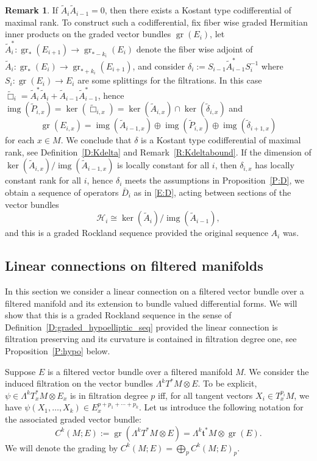 \documentclass[reqno,12pt]{amsart}
\DeclareMathOperator{\img}{img}
\DeclareMathOperator{\gr}{gr}
\theoremstyle{plain}
\theoremstyle{definition}
\newtheorem{remark}[theorem]{Remark}
\begin{document}
\begin{remark}\label{R:Kdeltaexi}
If $\tilde A_i\tilde A_{i-1}=0$, then there exists a Kostant type codifferential of maximal rank.
To construct such a codifferential, fix fiber wise graded Hermitian inner products on the graded vector bundles $\gr(E_i)$, let $\tilde A_i^*\colon\gr_*(E_{i+1})\to\gr_{*-k_i}(E_i)$ denote the fiber wise adjoint of $\tilde A_i\colon\gr_*(E_i)\to\gr_{*+k_i}(E_{i+1})$, and consider $\delta_i:=S_{i-1}\tilde A_{i-1}^*S_i^{-1}$ where $S_i\colon\gr(E_i)\to E_i$ are some splittings for the filtrations.
In this case $\tilde\Box_i=\tilde A_i^*\tilde A_i+\tilde A_{i-1}\tilde A_{i-1}^*$, hence $\img(\tilde P_{i,x})=\ker(\tilde\Box_{i,x})=\ker(\tilde A_{i,x})\cap\ker(\tilde\delta_{i,x})$ 
and 
$$
\gr(E_{i,x})=\img(\tilde A_{i-1,x})\oplus\img(\tilde P_{i,x})\oplus\img(\tilde\delta_{i+1,x})
$$
for each $x\in M$.
We conclude that $\delta$ is a Kostant type codifferential of maximal rank, see Definition~\ref{D:Kdelta} and Remark~\ref{R:Kdeltabound}.
If the dimension of $\ker(\tilde A_{i,x})/\img(\tilde A_{i-1,x})$ is locally constant for all $i$, then $\delta_{i,x}$ has locally constant rank for all $i$, hence $\delta_i$ meets the assumptions in Proposition~\ref{P:D}, we obtain a sequence of operators $\bar D_i$ as in \eqref{E:D}, acting between sections of the vector bundles 
$$
\mathcal H_i\cong\ker(\tilde A_i)/\img(\tilde A_{i-1}),
$$ 
and this is a graded Rockland sequence provided the original sequence $A_i$ was.
\end{remark}






\subsection{Linear connections on filtered manifolds}\label{SS:linearconnections}





In this section we consider a linear connection on a filtered vector bundle over a filtered manifold and its extension to bundle valued differential forms.
We will show that this is a graded Rockland sequence in the sense of Definition~\ref{D:graded_hypoelliptic_seq} provided the linear connection is filtration preserving and its curvature is contained in filtration degree one, see Proposition~\ref{P:hypo} below.


Suppose $E$ is a filtered vector bundle over a filtered manifold $M$.
We consider the induced filtration on the vector bundles $\Lambda^kT^*M\otimes E$.
To be explicit, $\psi\in\Lambda^kT^*_xM\otimes E_x$ is in filtration degree $p$ iff, for all tangent vectors $X_i\in T^{p_i}_xM$, we have $\psi(X_1,\dotsc,X_k)\in E_x^{p+p_1+\cdots+p_k}$.
Let us introduce the following notation for the associated graded vector bundle:
\begin{equation}\label{E:CkME}
C^k(M;E):=
\gr(\Lambda^kT^*M\otimes E)=\Lambda^k\mathfrak t^*M\otimes\gr(E).
\end{equation}
We will denote the grading by $C^k(M;E)=\bigoplus_pC^k(M;E)_p$.
\end{document}
